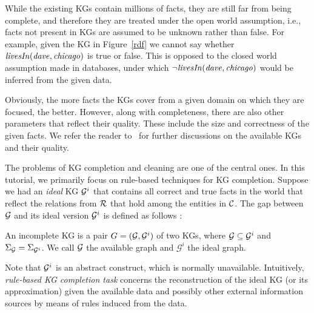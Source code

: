 While the existing KGs contain millions of facts, they are still far from being complete, and therefore they are treated under the open world assumption, i.e., facts not present in KGs are assumed to be unknown rather than false. For example, given the KG in Figure~\ref{rdf} we cannot say whether $\mathit{livesIn(dave,chicago)}$ is true or false. This is opposed to the closed world assumption made in databases, under which $\mathit{\neg livesIn(dave,chicago)}$ would be inferred from the given data.

Obviously, the more facts the KGs cover from a given domain on which they are focused, the better. However, along with completeness, there are also other parameters that reflect their quality. These include the size and correctness of the given facts.  We refer the reader to~\cite{Nickel2015ARO,DBLP:journals/semweb/Paulheim17} for further discussions on the available KGs and their quality.


The problems of KG completion and cleaning are one of the central ones. In this tutorial, we primarily focus on rule-based techniques for KG completion.
Suppose we had an \emph{ideal} KG $\mathcal{G}^i$ that contains all correct and true facts in the world that reflect the relations from $\mathcal{R}$ that hold among the entities in $\mathcal{C}$. The gap between $\mathcal{G}$ and its ideal version $\mathcal{G}^i$ is defined as follows \cite{rdfcomp}: 

\begin{definition} An incomplete KG is a pair
    $G = (\mathcal{G}, \mathcal{G}^i)$ of two KGs, where $\mathcal{G}\subseteq \mathcal{G}^i$ and
    $\Sigma_{\mathcal{G}}=\Sigma_{\mathcal{G}^i}$. We call $\mathcal{G}$ the available
    graph and $\mathcal{G}^i$ the ideal graph.  \end{definition}
    
Note that $\mathcal{G}^i$ is an abstract construct, which is normally unavailable. Intuitively, \emph{rule-based KG completion task} concerns the reconstruction of the ideal KG (or its approximation) given the available data and possibly other external information sources by means of rules induced from the data.

